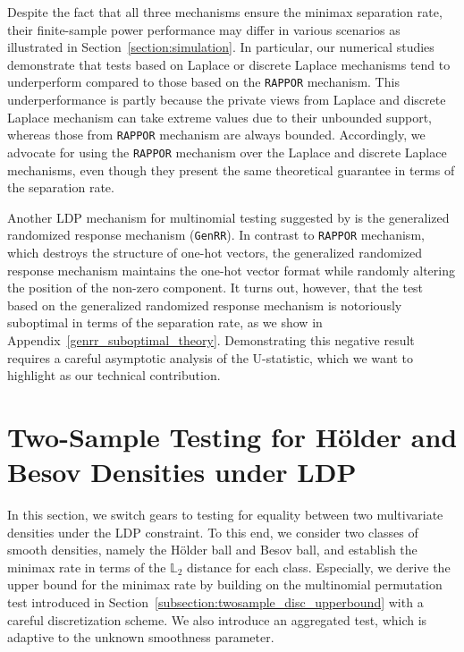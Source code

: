 \documentclass[twoside,11pt]{article}
\begin{document}
Despite the fact that all three mechanisms ensure the minimax separation rate, their finite-sample power performance may differ in various scenarios as illustrated in Section~\ref{section:simulation}. In particular, our numerical studies demonstrate that tests based on Laplace or discrete Laplace mechanisms tend to underperform compared to those based on the \texttt{RAPPOR} mechanism. This underperformance is partly because the private views from Laplace and discrete Laplace mechanism can take extreme values due to their unbounded support, whereas those from \texttt{RAPPOR} mechanism are always bounded. Accordingly, we advocate for using the \texttt{RAPPOR} mechanism over the Laplace and discrete Laplace mechanisms, even though they present the same theoretical guarantee in terms of the separation rate.

Another LDP mechanism for multinomial testing suggested by \citet{Gaboardi2016DPChisq} is the generalized randomized response mechanism (\texttt{GenRR}). In contrast to \texttt{RAPPOR} mechanism, which destroys the structure of one-hot vectors, the generalized randomized response mechanism maintains the one-hot vector format while randomly altering the position of the non-zero component. It turns out, however, that the test based on the generalized randomized response mechanism is notoriously suboptimal in terms of the separation rate, as we show in Appendix~\ref{genrr_suboptimal_theory}. Demonstrating this negative result requires a careful asymptotic analysis of the U-statistic, which we want to highlight as our technical contribution.
%
\section{Two-Sample Testing for H\"{o}lder and Besov Densities under LDP}\label{section:twosample_conti}
In this section, we switch gears to testing for equality between two multivariate densities under the LDP constraint. To this end, we consider two classes of smooth densities, namely the H\"{o}lder ball and Besov ball, and establish the minimax rate in terms of the $\mathbb{L}_2$ distance for each class. Especially, we derive the upper bound for the minimax rate by building on the multinomial permutation test introduced in Section~\ref{subsection:twosample_disc_upperbound} with a careful discretization scheme. We also introduce an aggregated test, which is adaptive to the unknown smoothness parameter. 
\end{document}
